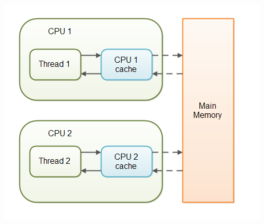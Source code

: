 \documentclass{article}
\begin{document}
\begin{center}
\includegraphics[scale=0.5]{volatile.png}
\end{center}
\end{document}
